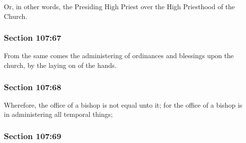 		Or, in other words, the Presiding High Priest over the High Priesthood of the Church.


	\subsubsection{Section 107:67} %
		\label{DC107-67}

		From the same comes the administering of ordinances and blessings upon the church, by the laying on of the hands.


	\subsubsection{Section 107:68} %
		\label{DC107-68}

		Wherefore, the office of a bishop is not equal unto it; for the office of a bishop is in administering all temporal things;


	\subsubsection{Section 107:69} %
		\label{DC107-69}


